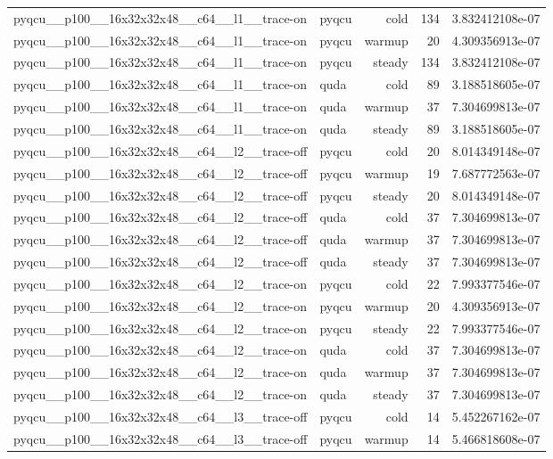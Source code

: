 \begin{table}[htbp]
\begin{tabular}{@{}llrrr@{}}
pyqcu\_\_p100\_\_16x32x32x48\_\_c64\_\_l1\_\_trace-on & pyqcu & cold & 134 & 3.832412108e-07 \\
pyqcu\_\_p100\_\_16x32x32x48\_\_c64\_\_l1\_\_trace-on & pyqcu & warmup & 20 & 4.309356913e-07 \\
pyqcu\_\_p100\_\_16x32x32x48\_\_c64\_\_l1\_\_trace-on & pyqcu & steady & 134 & 3.832412108e-07 \\
pyqcu\_\_p100\_\_16x32x32x48\_\_c64\_\_l1\_\_trace-on & quda & cold & 89 & 3.188518605e-07 \\
pyqcu\_\_p100\_\_16x32x32x48\_\_c64\_\_l1\_\_trace-on & quda & warmup & 37 & 7.304699813e-07 \\
pyqcu\_\_p100\_\_16x32x32x48\_\_c64\_\_l1\_\_trace-on & quda & steady & 89 & 3.188518605e-07 \\
pyqcu\_\_p100\_\_16x32x32x48\_\_c64\_\_l2\_\_trace-off & pyqcu & cold & 20 & 8.014349148e-07 \\
pyqcu\_\_p100\_\_16x32x32x48\_\_c64\_\_l2\_\_trace-off & pyqcu & warmup & 19 & 7.687772563e-07 \\
pyqcu\_\_p100\_\_16x32x32x48\_\_c64\_\_l2\_\_trace-off & pyqcu & steady & 20 & 8.014349148e-07 \\
pyqcu\_\_p100\_\_16x32x32x48\_\_c64\_\_l2\_\_trace-off & quda & cold & 37 & 7.304699813e-07 \\
pyqcu\_\_p100\_\_16x32x32x48\_\_c64\_\_l2\_\_trace-off & quda & warmup & 37 & 7.304699813e-07 \\
pyqcu\_\_p100\_\_16x32x32x48\_\_c64\_\_l2\_\_trace-off & quda & steady & 37 & 7.304699813e-07 \\
pyqcu\_\_p100\_\_16x32x32x48\_\_c64\_\_l2\_\_trace-on & pyqcu & cold & 22 & 7.993377546e-07 \\
pyqcu\_\_p100\_\_16x32x32x48\_\_c64\_\_l2\_\_trace-on & pyqcu & warmup & 20 & 4.309356913e-07 \\
pyqcu\_\_p100\_\_16x32x32x48\_\_c64\_\_l2\_\_trace-on & pyqcu & steady & 22 & 7.993377546e-07 \\
pyqcu\_\_p100\_\_16x32x32x48\_\_c64\_\_l2\_\_trace-on & quda & cold & 37 & 7.304699813e-07 \\
pyqcu\_\_p100\_\_16x32x32x48\_\_c64\_\_l2\_\_trace-on & quda & warmup & 37 & 7.304699813e-07 \\
pyqcu\_\_p100\_\_16x32x32x48\_\_c64\_\_l2\_\_trace-on & quda & steady & 37 & 7.304699813e-07 \\
pyqcu\_\_p100\_\_16x32x32x48\_\_c64\_\_l3\_\_trace-off & pyqcu & cold & 14 & 5.452267162e-07 \\
pyqcu\_\_p100\_\_16x32x32x48\_\_c64\_\_l3\_\_trace-off & pyqcu & warmup & 14 & 5.466818608e-07 \\

\end{tabular}
\end{table}
